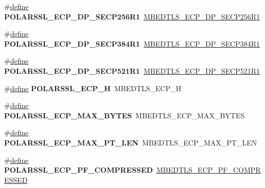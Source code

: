 \begin{DoxyCompactItemize}
\#\hyperlink{structdefine}{define} {\bfseries P\+O\+L\+A\+R\+S\+S\+L\+\_\+\+E\+C\+P\+\_\+\+D\+P\+\_\+\+S\+E\+C\+P256\+R1}~\hyperlink{ecp_8h_af79e530ea8f8416480f805baa20b1a2daf73bbf7b29d26a0bc77dcff47cd6b276}{M\+B\+E\+D\+T\+L\+S\+\_\+\+E\+C\+P\+\_\+\+D\+P\+\_\+\+S\+E\+C\+P256\+R1}
\item 
\mbox{\label{compat-1_83_8h_aa9b2118a6d61de8ce2842afaff5abef3}} 
\#\hyperlink{structdefine}{define} {\bfseries P\+O\+L\+A\+R\+S\+S\+L\+\_\+\+E\+C\+P\+\_\+\+D\+P\+\_\+\+S\+E\+C\+P384\+R1}~\hyperlink{ecp_8h_af79e530ea8f8416480f805baa20b1a2da08d0615820297b8c90f8ec7cbd88f641}{M\+B\+E\+D\+T\+L\+S\+\_\+\+E\+C\+P\+\_\+\+D\+P\+\_\+\+S\+E\+C\+P384\+R1}
\item 
\mbox{\label{compat-1_83_8h_a7b441d81baa207e1ca5dcf9bd78aa38f}} 
\#\hyperlink{structdefine}{define} {\bfseries P\+O\+L\+A\+R\+S\+S\+L\+\_\+\+E\+C\+P\+\_\+\+D\+P\+\_\+\+S\+E\+C\+P521\+R1}~\hyperlink{ecp_8h_af79e530ea8f8416480f805baa20b1a2daaa2d9d42df56aab024ef760ee9dffca2}{M\+B\+E\+D\+T\+L\+S\+\_\+\+E\+C\+P\+\_\+\+D\+P\+\_\+\+S\+E\+C\+P521\+R1}
\item 
\mbox{\label{compat-1_83_8h_ac0bcb0b5f0a28e405ef97b5f3817eb88}} 
\#\hyperlink{structdefine}{define} {\bfseries P\+O\+L\+A\+R\+S\+S\+L\+\_\+\+E\+C\+P\+\_\+H}~M\+B\+E\+D\+T\+L\+S\+\_\+\+E\+C\+P\+\_\+H
\item 
\mbox{\label{compat-1_83_8h_a1ef9d88cd3a37a2fef0267d1dfe72510}} 
\#\hyperlink{structdefine}{define} {\bfseries P\+O\+L\+A\+R\+S\+S\+L\+\_\+\+E\+C\+P\+\_\+\+M\+A\+X\+\_\+\+B\+Y\+T\+ES}~M\+B\+E\+D\+T\+L\+S\+\_\+\+E\+C\+P\+\_\+\+M\+A\+X\+\_\+\+B\+Y\+T\+ES
\item 
\mbox{\label{compat-1_83_8h_a7c7d2c178fceae9dc252cc111cd845ef}} 
\#\hyperlink{structdefine}{define} {\bfseries P\+O\+L\+A\+R\+S\+S\+L\+\_\+\+E\+C\+P\+\_\+\+M\+A\+X\+\_\+\+P\+T\+\_\+\+L\+EN}~M\+B\+E\+D\+T\+L\+S\+\_\+\+E\+C\+P\+\_\+\+M\+A\+X\+\_\+\+P\+T\+\_\+\+L\+EN
\item 
\mbox{\label{compat-1_83_8h_ad429f374f5b86942b9561edce9c99082}} 
\#\hyperlink{structdefine}{define} {\bfseries P\+O\+L\+A\+R\+S\+S\+L\+\_\+\+E\+C\+P\+\_\+\+P\+F\+\_\+\+C\+O\+M\+P\+R\+E\+S\+S\+ED}~\hyperlink{ecp_8h_a300814dc5a3ef878a5fb34cc2f185e7a}{M\+B\+E\+D\+T\+L\+S\+\_\+\+E\+C\+P\+\_\+\+P\+F\+\_\+\+C\+O\+M\+P\+R\+E\+S\+S\+ED}

\end{DoxyCompactItemize}
